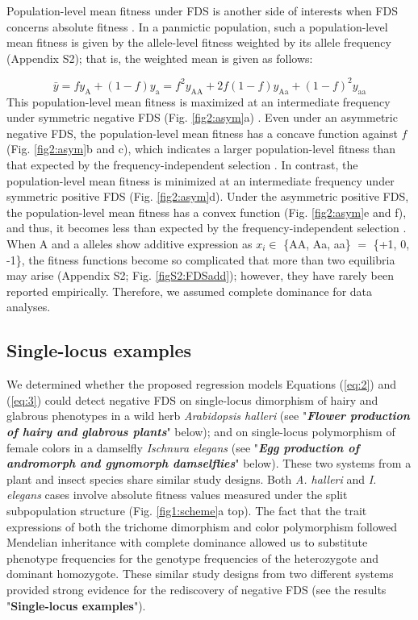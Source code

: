 \documentclass[12pt,]{article}
\begin{document}
Population-level mean fitness under FDS is another side of interests when FDS concerns absolute fitness \citep{cockerham1972frequency,schneider_maximization_2008,takahashi2018balanced}. In a panmictic population, such a population-level mean fitness is given by the allele-level fitness weighted by its allele frequency (Appendix S2); that is, the weighted mean is given as follows:

\begin{equation}
\bar{y} = f y_\mathrm{A} + (1-f)y_\mathrm{a} = f^2 y_\mathrm{AA} + 2f (1-f)y_\mathrm{Aa} + (1-f)^2y_\mathrm{aa} \label{eq:6}
\end{equation}
\noindent
This population-level mean fitness is maximized at an intermediate frequency under symmetric negative FDS (Fig. \ref{fig2:asym}a) \citep{schneider_maximization_2008}. Even under an asymmetric negative FDS, the population-level mean fitness has a concave function against $f$ (Fig. \ref{fig2:asym}b and c), which indicates a larger population-level fitness than that expected by the frequency-independent selection \citep{takahashi2018balanced}. In contrast, the population-level mean fitness is minimized at an intermediate frequency under symmetric positive FDS (Fig. \ref{fig2:asym}d). Under the asymmetric positive FDS, the population-level mean fitness has a convex function (Fig. \ref{fig2:asym}e and f), and thus, it becomes less than expected by the frequency-independent selection \citep{schneider_maximization_2008, takahashi2018balanced}. When A and a alleles show additive expression as $x_i \in$ \{AA, Aa, aa\} $=$ \{+1, 0, -1\}, the fitness functions become so complicated that more than two equilibria may arise (Appendix S2; Fig. \ref{figS2:FDSadd}); however, they have rarely been reported empirically. Therefore, we assumed complete dominance for data analyses.

\subsection{Single-locus examples}
We determined whether the proposed regression models Equations (\ref{eq:2}) and (\ref{eq:3}) could detect negative FDS on single-locus dimorphism of hairy and glabrous phenotypes in a wild herb \textit{Arabidopsis halleri} (see "\textit{\textbf{Flower production of hairy and glabrous plants}}" below); and on single-locus polymorphism of female colors in a damselfly \textit{Ischnura elegans} (see "\textit{\textbf{Egg production of andromorph and gynomorph damselflies}}" below). These two systems from a plant and insect species share similar study designs. Both \textit{A. halleri} and \textit{I. elegans} cases involve absolute fitness values measured under the split subpopulation structure (Fig. \ref{fig1:scheme}a top). The fact that the trait expressions of both the trichome dimorphism and color polymorphism followed Mendelian inheritance with complete dominance \citep{shimizu2002ecology, sanchez2005hybridization, kawagoe2011coexistence} allowed us to substitute phenotype frequencies for the genotype frequencies of the heterozygote and dominant homozygote. These similar study designs from two different systems provided strong evidence for the rediscovery of negative FDS (see the results "\textbf{Single-locus examples}").
\end{document}
